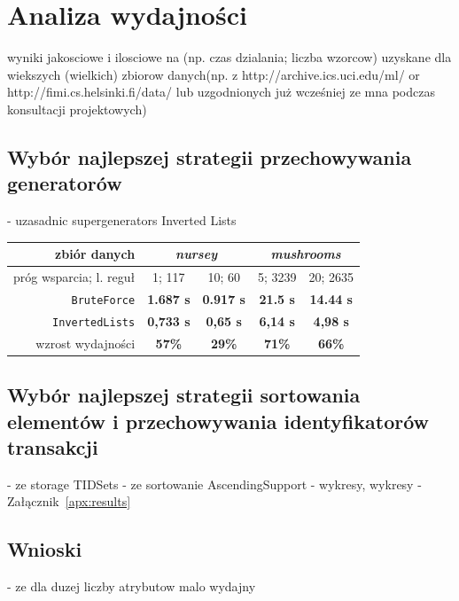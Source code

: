 \documentclass[a4paper,10pt]{article}
\begin{document}
\section{Analiza wydajności} \label{sec:anal}
wyniki jakosciowe i ilosciowe na (np. czas dzialania; liczba wzorcow)
uzyskane dla wiekszych (wielkich) zbiorow danych(np. z
http://archive.ics.uci.edu/ml/ or http://fimi.cs.helsinki.fi/data/ lub
uzgodnionych już wcześniej ze mna podczas konsultacji projektowych)


 \subsection{Wybór najlepszej strategii przechowywania generatorów}
 - uzasadnic supergenerators Inverted Lists
 
 \begin{center}
  \begin{tabular}{ | r || c | c | c | c | }
   \hline
   zbiór danych            & \multicolumn{2}{|c|}{\emph{nursey}} & \multicolumn{2}{|c|}{\emph{mushrooms}} \\
   \hline
   próg wsparcia; l. reguł & 1; 117           & 10; 60           & 5; 3239            & 20; 2635          \\
   \hline
   \verb+BruteForce+       & \textbf{1.687 s} & \textbf{0.917 s} & \textbf{21.5 s}    & \textbf{14.44 s}  \\
   \hline
   \verb+InvertedLists+    & \textbf{0,733 s} & \textbf{0,65 s}  & \textbf{6,14 s}    & \textbf{4,98 s}   \\
   \hline
   wzrost wydajności       & \textbf{57\%}    & \textbf{29\%}    & \textbf{71\%}      & \textbf{66\%}     \\
   \hline
  \end{tabular}
 \end{center}

 \subsection{Wybór najlepszej strategii sortowania elementów i przechowywania identyfikatorów transakcji}
 - ze storage TIDSets
 - ze sortowanie AscendingSupport
 - wykresy, wykresy
 - Załącznik~\ref{apx:results}
 
 
 \subsection{Wnioski}
 - ze dla duzej liczby atrybutow malo wydajny
\end{document}
